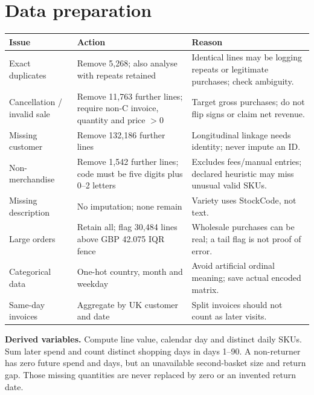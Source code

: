\documentclass[10pt,a4paper,twocolumn]{article}
\begin{document}
\section{Data preparation}
\par
{\footnotesize\begin{tabularx}{\linewidth}{@{}L{1.8cm}L{2.2cm}Y@{}}\toprule
Issue&Action&Reason\\\midrule
Exact duplicates&Remove 5,268; also analyse with repeats retained&Identical lines may be logging repeats or legitimate purchases; check ambiguity.\\
Cancellation / invalid sale&Remove 11,763 further lines; require non-C invoice, quantity and price $>0$&Target gross purchases; do not flip signs or claim net revenue.\\
Missing customer&Remove 132,186 further lines&Longitudinal linkage needs identity; never impute an ID.\\
Non-merchandise&Remove 1,542 further lines; code must be five digits plus 0--2 letters&Excludes fees/manual entries; declared heuristic may miss unusual valid SKUs.\\
Missing description&No imputation; none remain&Variety uses StockCode, not text.\\
Large orders&Retain all; flag 30,484 lines above GBP 42.075 IQR fence&Wholesale purchases can be real; a tail flag is not proof of error.\\
Categorical data&One-hot country, month and weekday&Avoid artificial ordinal meaning; save actual encoded matrix.\\
Same-day invoices&Aggregate by UK customer and date&Split invoices should not count as later visits.\\\bottomrule
\end{tabularx}}\par
\textbf{Derived variables.} Compute line value, calendar day and distinct daily SKUs. Sum later spend and count distinct shopping days in days 1--90. A non-returner has zero future spend and days, but an unavailable second-basket size and return gap. Those missing quantities are never replaced by zero or an invented return date.
\end{document}
